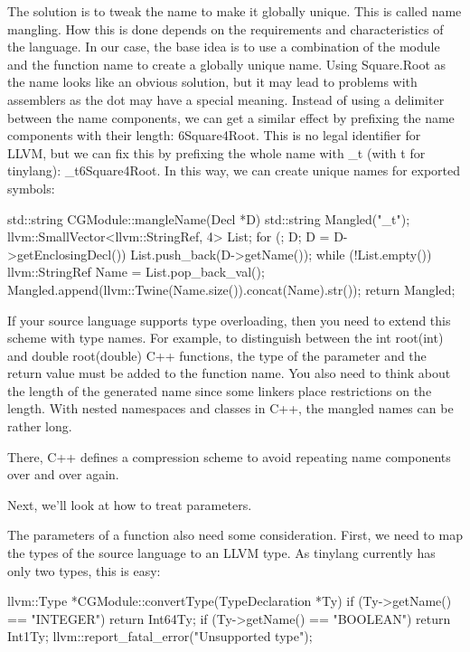 The solution is to tweak the name to make it globally unique. This is called name mangling. How this is done depends on the requirements and characteristics of the language. In our case, the base idea is to use a combination of the module and the function name to create a globally unique name. Using Square.Root as the name looks like an obvious solution, but it may lead to problems with assemblers as the dot may have a special meaning. Instead of using a delimiter between the name components, we can get a similar effect by prefixing the name components with their length: 6Square4Root. This is no legal identifier for LLVM, but we can fix this by prefixing the whole name with \_t (with t for tinylang): \_t6Square4Root. In this way, we can create unique names for exported symbols:

\begin{cpp}
std::string CGModule::mangleName(Decl *D) {
    std::string Mangled("_t");
    llvm::SmallVector<llvm::StringRef, 4> List;
    for (; D; D = D->getEnclosingDecl())
        List.push_back(D->getName());
    while (!List.empty()) {
        llvm::StringRef Name = List.pop_back_val();
        Mangled.append(llvm::Twine(Name.size()).concat(Name).str());
    }
    return Mangled;
}
\end{cpp}

If your source language supports type overloading, then you need to extend this scheme with type names. For example, to distinguish between the int root(int) and double root(double) C++ functions, the type of the parameter and the return value must be added to the function name.
You also need to think about the length of the generated name since some linkers place restrictions on the length. With nested namespaces and classes in C++, the mangled names can be rather long.

There, C++ defines a compression scheme to avoid repeating name components over and over again.

Next, we’ll look at how to treat parameters.



The parameters of a function also need some consideration. First, we need to map the types of the source language to an LLVM type. As tinylang currently has only two types, this is easy:

\begin{cpp}
llvm::Type *CGModule::convertType(TypeDeclaration *Ty) {
    if (Ty->getName() == "INTEGER")
        return Int64Ty;
    if (Ty->getName() == "BOOLEAN")
        return Int1Ty;
    llvm::report_fatal_error("Unsupported type");
}
\end{cpp}

